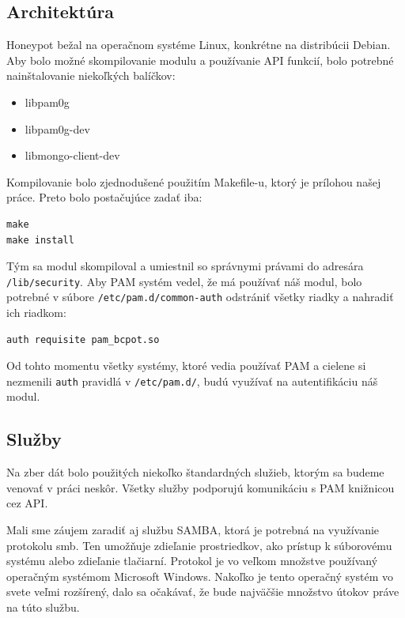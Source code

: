 \documentclass[12pt, oneside]{book}
\begin{document}
\subsection{Architektúra}

Honeypot bežal na operačnom systéme Linux, konkrétne na distribúcii Debian.
Aby bolo možné skompilovanie modulu a používanie API funkcií, bolo potrebné nainštalovanie niekoľkých balíčkov:
\begin{itemize}
\item libpam0g
\item libpam0g-dev
\item libmongo-client-dev
\end{itemize}
  
Kompilovanie bolo zjednodušené použitím Makefile-u, ktorý je prílohou našej práce.
Preto bolo postačujúce zadať iba:

\begin{lstlisting}[style=customBash]
make
make install
\end{lstlisting}

Tým sa modul skompiloval a umiestnil so správnymi právami do a\-dre\-sá\-ra \texttt{/lib/security}.
Aby PAM systém vedel, že má používať náš modul, bolo potrebné v súbore \texttt{/etc/pam.d/common-auth} odstrániť všetky riadky a nahradiť ich riadkom:
\begin{lstlisting}[style=customBash]
auth requisite pam_bcpot.so
\end{lstlisting}

Od tohto momentu všetky systémy, ktoré vedia používať PAM a cielene si nezmenili \texttt{auth} pravidlá v \texttt{/etc/pam.d/}, budú využívať na autentifikáciu náš modul.

\subsection{Služby}

Na zber dát bolo použitých niekoľko štandardných služieb, ktorým sa budeme venovať v práci neskôr.
Všetky služby podporujú komunikáciu s PAM kniž\-ni\-cou cez API.

Mali sme záujem zaradiť aj službu SAMBA, ktorá je potrebná na využívanie protokolu smb.
Ten umožňuje zdieľanie prostriedkov, ako prístup k súborovému systému alebo zdieľanie tlačiarní.
Protokol je vo veľkom množstve používaný operačným systémom Microsoft Windows.
Nakoľko je tento operačný systém vo svete veľmi rozšírený, dalo sa očakávať, že bude najväčšie množstvo útokov práve na túto službu. 
\end{document}
